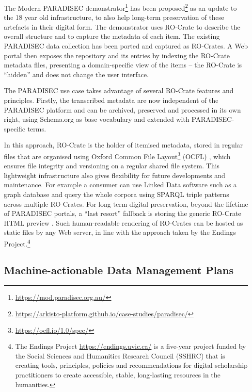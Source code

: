 \documentclass[ds,v1.1.2,openaccess]{iosart2x}%
\begin{document}
The Modern PARADISEC demonstrator\footnote{\url{https://mod.paradisec.org.au/}} has
been
proposed\footnote{\url{https://arkisto-platform.github.io/case-studies/paradisec/}}
as an update to the 18 year old infrastructure, to also help long-term
preservation of these artefacts in their digital form. The demonstrator
uses RO-Crate to describe the overall structure and to capture the
metadata of each item. The existing PARADISEC data collection has been
ported and captured as RO-Crates. A Web portal then exposes the
repository and its entries by indexing the RO-Crate metadata files,
presenting a domain-specific view of the items -- the RO-Crate is
``hidden'' and does not change the user interface.

The PARADISEC use case takes advantage of several RO-Crate features and
principles. Firstly, the transcribed metadata are now independent of
the PARADISEC platform and can be archived, preserved and processed in
its own right, using Schema.org as base vocabulary and extended with
PARADISEC-specific terms.

In this approach, RO-Crate is the holder of itemised metadata, stored
in regular files that are organised using Oxford Common File
Layout\footnote{\url{https://ocfl.io/1.0/spec/}} (OCFL) \cite{ocfl_2020}, which ensures
file integrity and versioning on a regular shared file system. This
lightweight infrastructure also gives flexibility for future
developments and maintenance. For example a consumer can use Linked
Data software such as a graph database and query the whole corpora
using SPARQL triple patterns across multiple RO-Crates. For long term
digital preservation, beyond the lifetime of PARADISEC portals, a
``last resort'' fallback is storing the generic RO-Crate HTML preview
\cite{ro-crate-html-js}. Such human-readable rendering of RO-Crates can be
hosted as static files by any Web server, in line with the approach
taken by the Endings Project.\footnote{The Endings Project \url{https://endings.uvic.ca/} is a five-year
project funded by the Social Sciences and Humanities Research Council
(SSHRC) that is creating tools, principles, policies and
recommendations for digital scholarship practitioners to create
accessible, stable, long-lasting resources in the humanities.}

\subsection{Machine-actionable Data Management Plans}%

\label{sec:dmp}
\end{document}
